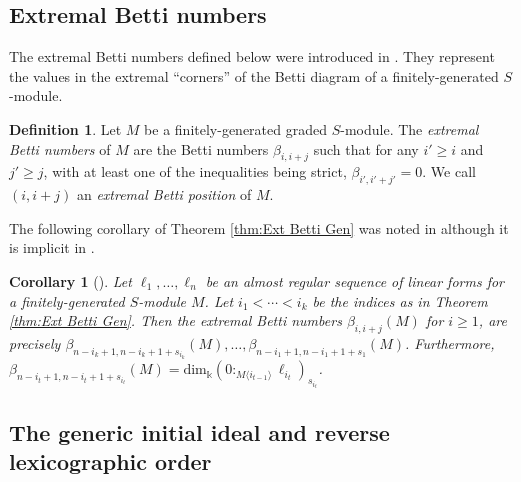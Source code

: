 \documentclass[a4paper, 10pt, reqno, english, ones]{amsart}  %
\newtheorem{proposition}[theorem]{Proposition}
\newtheorem{corollary}[theorem]{Corollary}
\theoremstyle{definition}
\newtheorem{definition}[theorem]{Definition}
\theoremstyle{remark}
\begin{document}

\subsection{Extremal Betti numbers}\label{sec:ext betti numbers}

The extremal Betti numbers defined below were introduced in \cite{bayer1999extremal}. They represent the values in the extremal ``corners'' of the Betti diagram of a finitely-generated $S$-module.

\begin{definition}\label{def:ext betti}
    Let $M$ be a finitely-generated graded $S$-module. The \textit{extremal Betti numbers} of $M$ are the Betti numbers $\beta_{i,i+j}$ such that for any $i'\geq i$ and $j'\geq j$, with at least one of the inequalities being strict, $\beta_{i',i'+j'} = 0$. We call $(i,i+j)$ an \textit{extremal Betti position} of $M$.
\end{definition}

The following corollary of Theorem \ref{thm:Ext Betti Gen} was noted in \cite{aramova2000Almost} although it is implicit in \cite{bayer1999extremal}.

\begin{corollary}[\cite{aramova2000Almost}]
    Let $\ell_1,\dots,\ell_n$ be an almost regular sequence of linear forms for a finitely-generated $S$-module $M$. Let $i_1<\cdots<i_k$ be the indices as in Theorem \ref{thm:Ext Betti Gen}. Then the extremal Betti numbers $\beta_{i,i+j}(M)$ for $i\geq 1$,  are precisely $\beta_{n-i_k+1,n-i_k+1+s_{i_k}}(M),\dots,\beta_{n-i_1+1,n-i_1+1+s_1}(M)$. Furthermore, $\beta_{n-i_t+1,n-i_t+1+s_{i_t}}(M) = \textrm{dim}_\Bbbk(0:_{M\langle i_{t-1} \rangle}\ell_{i_t})_{s_{i_t}}$.
\end{corollary}

\subsection{The generic initial ideal and reverse lexicographic order}\label{sec:GIN and RevLex}
\end{document}
